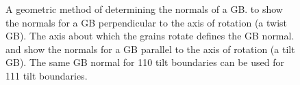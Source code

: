 \documentclass[twoside,senior]{BYUPhys}
\begin{document}
\begin{figure}[ht!]
 \quad
 \quad
 \caption[Geometric method of determining grain boundary normals.]{\label{fig:PlaneNorms}A geometric method of determining the normals of a GB.  \protect{} to \protect{} show the normals for a GB perpendicular to the axis of rotation (a twist GB).  The axis about which the grains rotate defines the GB normal. \protect{} and \protect{} show the normals for a GB parallel to the axis of rotation (a tilt GB).  The same GB normal for \textlangle{}110\textrangle{} tilt boundaries can be used for \textlangle{}111\textrangle{} tilt boundaries.}

\end{figure}
\end{document}
